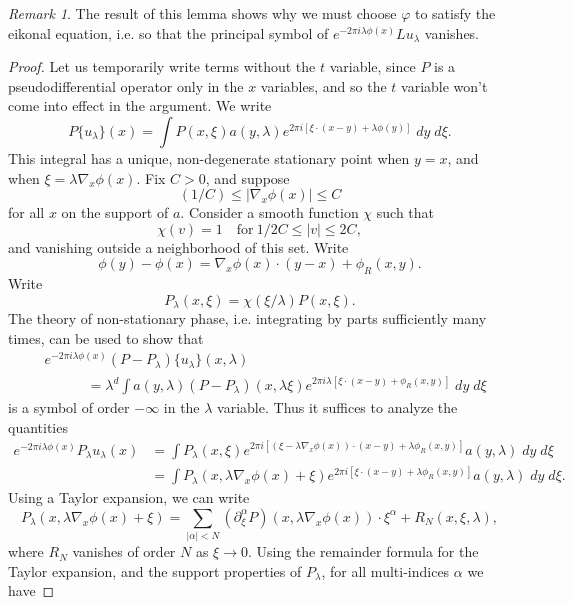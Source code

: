 \documentclass{article}
\theoremstyle{plain}
\theoremstyle{remark}
\newtheorem*{remark}{Remark}
\theoremstyle{definition}
\begin{document}
\begin{remark}
	The result of this lemma shows why we must choose $\varphi$ to satisfy the eikonal equation, i.e. so that the principal symbol of $e^{-2 \pi i \lambda \phi(x)} L u_\lambda$ vanishes.
\end{remark}

\begin{proof}
	Let us temporarily write terms without the $t$ variable, since $P$ is a pseudodifferential operator only in the $x$ variables, and so the $t$ variable won't come into effect in the argument. We write
	\[ P \{ u_\lambda \} (x) = \int P(x, \xi) a(y,\lambda) e^{2 \pi i [ \xi \cdot (x - y) + \lambda \phi(y) ]}\; dy\; d\xi. \]
	This integral has a unique, non-degenerate stationary point when $y = x$, and when $\xi = \lambda \nabla_x \phi(x)$. Fix $C > 0$, and suppose
	\[ (1/C) \leq |\nabla_x \phi(x)| \leq C \]
	for all $x$ on the support of $a$. Consider a smooth function $\chi$ such that
	\[ \chi(v) = 1 \quad\text{for}\ 1/2C \leq |v| \leq 2C, \]
	and vanishing outside a neighborhood of this set. Write
	\[ \phi(y) - \phi(x) = \nabla_x \phi(x) \cdot (y - x) + \phi_R(x,y). \]
	Write
	\[ P_\lambda(x,\xi) = \chi(\xi / \lambda) P(x,\xi). \]
	The theory of non-stationary phase, i.e. integrating by parts sufficiently many times, can be used to show that
	\begin{align*}
		& e^{- 2 \pi i \lambda \phi(x) } (P - P_\lambda) \{ u_\lambda \} (x,\lambda)\\
		& \quad\quad\quad = \lambda^d \int a(y,\lambda) (P - P_\lambda)(x,\lambda \xi) e^{2 \pi i \lambda [ \xi \cdot (x - y) + \phi_R(x,y) ]}\; dy\; d\xi
	\end{align*}
	is a symbol of order $-\infty$ in the $\lambda$ variable. Thus it suffices to analyze the quantities
	\begin{align*}
		e^{-2 \pi i \lambda \phi(x)} P_\lambda u_\lambda(x) &= \int P_\lambda(x, \xi) e^{2 \pi i [ (\xi - \lambda \nabla_x \phi(x)) \cdot (x - y) + \lambda \phi_R(x,y) ]} a(y, \lambda)\; dy\; d\xi\\
		&= \int P_\lambda(x, \lambda \nabla_x \phi(x) + \xi) e^{2 \pi i [ \xi \cdot (x - y) + \lambda \phi_R(x,y) ]} a(y,\lambda)\; dy\; d\xi.
	\end{align*}
	Using a Taylor expansion, we can write
	\[ P_\lambda(x, \lambda \nabla_x \phi(x) + \xi) = \sum_{|\alpha| < N} (\partial_\xi^\alpha P)(x, \lambda \nabla_x \phi(x)) \cdot \xi^\alpha + R_N(x,\xi,\lambda), \]
	where $R_N$ vanishes of order $N$ as $\xi \to 0$. Using the remainder formula for the Taylor expansion, and the support properties of $P_\lambda$, for all multi-indices $\alpha$ we have

\end{proof}
\end{document}
